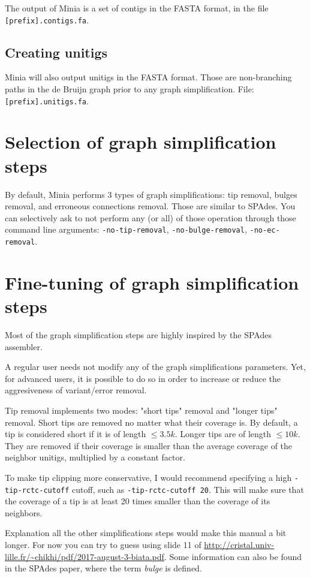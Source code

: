 \documentclass[a4paper]{article}
\begin{document}
The output of Minia is a set of contigs in the FASTA format, in the file \verb+[prefix].contigs.fa+. 

\subsection*{Creating unitigs}

Minia will also output unitigs in the FASTA format. Those are non-branching paths in the de Bruijn graph prior to any graph simplification. File: \verb+[prefix].unitigs.fa+. 

\section{Selection of graph simplification steps}

By default, Minia performs 3 types of graph simplifications: tip removal, bulges removal, and erroneous connections removal. Those are similar to SPAdes. You can selectively ask to not perform any (or all) of those operation through those command line arguments: \verb+-no-tip-removal+, \verb+-no-bulge-removal+, \verb+-no-ec-removal+.

\section{Fine-tuning of graph simplification steps}

Most of the graph simplification steps are highly inspired by the SPAdes assembler.

A regular user needs not modify any of the graph simplifications parameters.
Yet, for advanced users, it is possible to do so in order to increase or reduce the aggresiveness of variant/error removal.

Tip removal implements two modes: "short tips" removal and "longer tips" removal. Short tips are removed no matter what their coverage is. By default, a tip is considered short if it is of length $\leq 3.5k$. Longer tips are of length $\leq 10k$. They are removed if their coverage is smaller than the average coverage of the neighbor unitigs, multiplied by a constant factor.

To make tip clipping more conservative, I would recommend specifying a high \verb+-tip-rctc-cutoff+ cutoff, such as \verb+-tip-rctc-cutoff 20+. This will make sure that the coverage of a tip is at least 20 times smaller than the coverage of its neighbors.

Explanation all the other simplifications steps would make this manual a bit longer. For now you can try to guess using slide 11 of \url{http://cristal.univ-lille.fr/~chikhi/pdf/2017-august-3-biata.pdf}. Some information can also be found in the SPAdes paper, where the term \emph{bulge} is defined.
\end{document}
